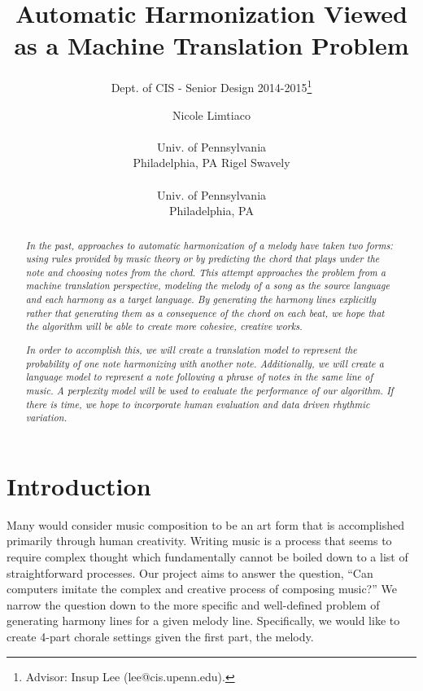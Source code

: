 \documentclass{sig-alternate}
\begin{document}
 

\title{Automatic Harmonization Viewed as a Machine Translation Problem}
\subtitle{Dept. of CIS - Senior Design 2014-2015\thanks{Advisor: Insup Lee (lee@cis.upenn.edu).}}
\author{
\alignauthor Nicole Limtiaco \\  \\ Univ. of Pennsylvania \\ Philadelphia, PA
\alignauthor Rigel Swavely \\  \\ Univ. of Pennsylvania \\ Philadelphia, PA}
\date{}
\maketitle

\begin{abstract}
  \textit{In the past, approaches to automatic harmonization of a melody
  have taken two forms: using rules provided by music theory or by predicting
  the chord that plays under the note and choosing notes from the chord. This
  attempt approaches the problem from a machine translation perspective, modeling
  the melody of a song as the source language and each harmony as a target language.
  By generating the harmony lines explicitly rather that generating them as a
  consequence of the chord on each beat, we hope that the algorithm will be able to create
  more cohesive, creative works.}

  \textit{In order to accomplish this, we will create a translation model to represent the probability
  of one note harmonizing with another note. Additionally, we will create a language model to represent
  a note following a phrase of notes in the same line of music. A perplexity model will be used to 
  evaluate the performance of our algorithm. If there is time, we hope to incorporate human evaluation
  and data driven rhythmic variation.}
\end{abstract}

\section{Introduction}
\label{sec:intro}
Many would consider music composition to be an art form that is accomplished
primarily through human creativity. Writing music is a process that seems to require
complex thought which fundamentally cannot be boiled down to a list of straightforward
processes. Our project aims to answer the question, ``Can computers imitate the complex
and creative process of composing music?'' We narrow the question down to the more specific
and well-defined problem of generating harmony lines for a given melody line. Specifically,
we would like to create 4-part chorale settings given the first part, the melody.
\end{document}
